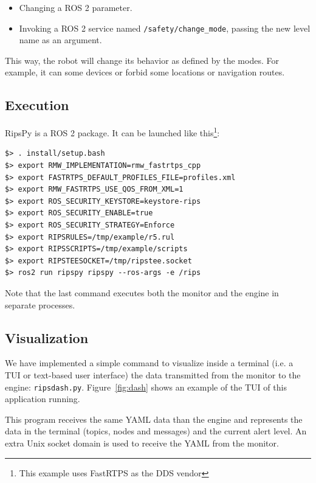 \documentclass[a4paper]{article}
\begin{document}
\begin{itemize}
	\item Changing a ROS 2 parameter.
	\item Invoking a ROS 2 service named \texttt{/safety/change\_mode},
	passing the new level name as an argument.
\end{itemize}

This way, the robot will change its behavior as defined by the modes. For
example, it can some devices or forbid some locations or navigation
routes.

\subsection{Execution}

RipsPy is a ROS 2 package.
It can be launched like this\footnote{This example uses FastRTPS as the DDS vendor}:

\begin{verbatim}
$> . install/setup.bash
$> export RMW_IMPLEMENTATION=rmw_fastrtps_cpp
$> export FASTRTPS_DEFAULT_PROFILES_FILE=profiles.xml
$> export RMW_FASTRTPS_USE_QOS_FROM_XML=1
$> export ROS_SECURITY_KEYSTORE=keystore-rips
$> export ROS_SECURITY_ENABLE=true
$> export ROS_SECURITY_STRATEGY=Enforce
$> export RIPSRULES=/tmp/example/r5.rul
$> export RIPSSCRIPTS=/tmp/example/scripts
$> export RIPSTEESOCKET=/tmp/ripstee.socket
$> ros2 run ripspy ripspy --ros-args -e /rips
\end{verbatim}

Note that the last command executes both the monitor and
the engine in separate processes.

\subsection{Visualization \label{sec:dash}}

We have implemented a simple command to visualize inside a terminal (i.e. a TUI
or text-based user interface)
the data transmitted from the monitor to the engine: \texttt{ripsdash.py}.
Figure~\ref{fig:dash} shows an example of the TUI
of this application running.

This program receives
the same YAML data than the engine
and represents the data in the terminal
(topics, nodes and messages) and the current alert level.
An extra Unix socket domain is used to receive the YAML from the monitor.
\end{document}
